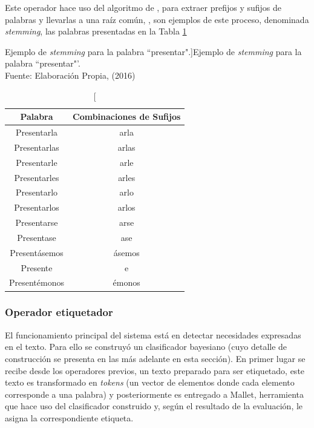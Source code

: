 Este operador hace uso del algoritmo de \cite{Porter}, para extraer prefijos y sufijos de palabras y llevarlas a una raíz común, \cite{StemmingLema}, son ejemplos de este proceso, denominada \textit{stemming}, las palabras presentadas en la Tabla \ref{tab:ejstemming}

\begin{table}[H]
\centering
\caption[Ejemplo de \textit{stemming} para la palabra ``presentar".]{Ejemplo de \textit{stemming} para la palabra ``presentar"'.\\Fuente: Elaboración Propia, (2016)}
\label{tab:ejstemming}
\begin{tabular}{|c|c|}
\hline
\textbf{Palabra} & \textbf{Combinaciones de Sufijos} \\ \hline
Presentarla      & arla                              \\ \hline
Presentarlas     & arlas                             \\ \hline
Presentarle      & arle                              \\ \hline
Presentarles     & arles                             \\ \hline
Presentarlo      & arlo                              \\ \hline
Presentarlos     & arlos                             \\ \hline
Presentarse      & arse                              \\ \hline
Presentase       & ase                               \\ \hline
Presentásemos    & ásemos                            \\ \hline
Presente         & e                                 \\ \hline
Presentémonos    & émonos                            \\ \hline
\end{tabular}
\end{table}

\subsubsection*{Operador etiquetador}
\label{subsubsec:7op}

El funcionamiento principal del sistema está en detectar necesidades expresadas en el texto. Para ello se construyó un clasificador bayesiano (cuyo detalle de construcción se presenta en las más adelante en esta sección). En primer lugar se recibe desde los operadores previos, un texto preparado para ser etiquetado, este texto es transformado en \textit{tokens} (un vector de elementos donde cada elemento corresponde a una palabra) y posteriormente es entregado a Mallet, herramienta que hace uso del clasificador construido y, según el resultado de la evaluación, le asigna la correspondiente etiqueta. 

